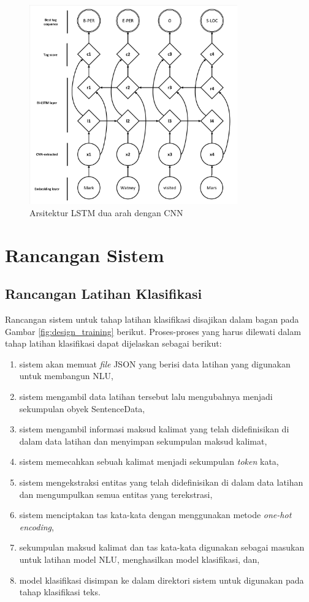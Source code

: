 \begin{figure}[H]
	\centering
	\includegraphics[width=0.8\textwidth, trim=2 2 2 2, clip]{resources/3/blstmcnn.pdf}
	\caption{Arsitektur LSTM dua arah dengan CNN \parencite{chiu2015named}}
	\label{fig:blstmcnn}
\end{figure}

\section{Rancangan Sistem}

\subsection{Rancangan Latihan Klasifikasi}

Rancangan sistem untuk tahap latihan klasifikasi disajikan dalam bagan pada Gambar \ref{fig:design_training} berikut. Proses-proses yang harus dilewati dalam tahap latihan klasifikasi dapat dijelaskan sebagai berikut:

\begin{enumerate}
	\item sistem akan memuat \textit{file} JSON yang berisi data latihan yang digunakan untuk membangun NLU,
	\item sistem mengambil data latihan tersebut lalu mengubahnya menjadi sekumpulan obyek SentenceData,
	\item sistem mengambil informasi maksud kalimat yang telah didefinisikan di dalam data latihan dan menyimpan sekumpulan maksud kalimat,
	\item sistem memecahkan sebuah kalimat menjadi sekumpulan \textit{token} kata,
	\item sistem mengekstraksi entitas yang telah didefinisikan di dalam data latihan dan mengumpulkan semua entitas yang terekstrasi,
	\item sistem menciptakan tas kata-kata dengan menggunakan metode \textit{one-hot encoding},
	\item sekumpulan maksud kalimat dan tas kata-kata digunakan sebagai masukan untuk latihan model NLU, menghasilkan model klasifikasi, dan,
	\item model klasifikasi disimpan ke dalam direktori sistem untuk digunakan pada tahap klasifikasi teks.
\end{enumerate}


